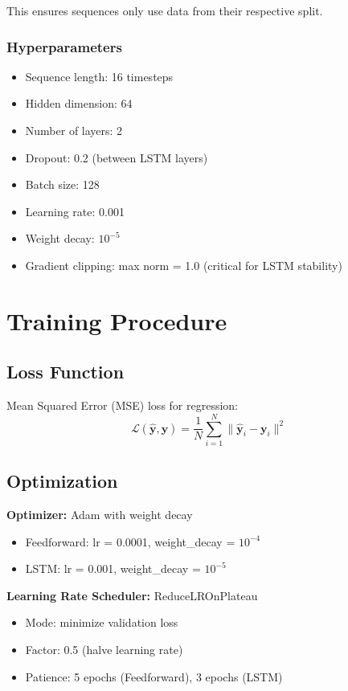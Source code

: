 \documentclass[12pt,a4paper]{article}
\begin{document}
This ensures sequences only use data from their respective split.

\subsubsection{Hyperparameters}
\begin{itemize}
    \item Sequence length: 16 timesteps
    \item Hidden dimension: 64
    \item Number of layers: 2
    \item Dropout: 0.2 (between LSTM layers)
    \item Batch size: 128
    \item Learning rate: 0.001
    \item Weight decay: $10^{-5}$
    \item Gradient clipping: max norm = 1.0 (critical for LSTM stability)
\end{itemize}

\section{Training Procedure}

\subsection{Loss Function}
Mean Squared Error (MSE) loss for regression:
\begin{equation}
    \mathcal{L}(\hat{\mathbf{y}}, \mathbf{y}) = \frac{1}{N}\sum_{i=1}^{N} \|\hat{\mathbf{y}}_i - \mathbf{y}_i\|^2
\end{equation}

\subsection{Optimization}
\textbf{Optimizer:} Adam with weight decay
\begin{itemize}
    \item Feedforward: lr = 0.0001, weight\_decay = $10^{-4}$
    \item LSTM: lr = 0.001, weight\_decay = $10^{-5}$
\end{itemize}

\textbf{Learning Rate Scheduler:} ReduceLROnPlateau
\begin{itemize}
    \item Mode: minimize validation loss
    \item Factor: 0.5 (halve learning rate)
    \item Patience: 5 epochs (Feedforward), 3 epochs (LSTM)
\end{itemize}
\end{document}
